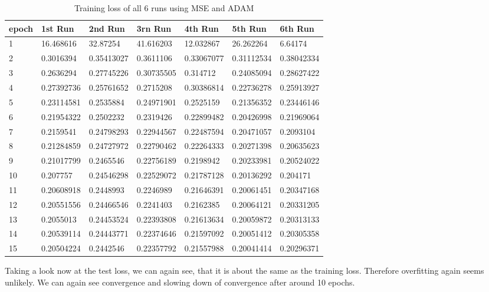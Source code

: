 \begin{table}[!ht]
    \centering
    \begin{tabular}{|l||l||l||l||l||l||l|}
    \hline
    epoch & 1st Run & 2nd Run & 3rn Run & 4th Run & 5th Run & 6th Run \\ \hline
        1 & 16.468616 & 32.87254 & 41.616203 & 12.032867 & 26.262264 & 6.64174 \\ \hline
        2 & 0.3016394 & 0.35413027 & 0.3611106 & 0.33067077 & 0.31112534 & 0.38042334 \\ \hline
        3 & 0.2636294 & 0.27745226 & 0.30735505 & 0.314712 & 0.24085094 & 0.28627422 \\ \hline
        4 & 0.27392736 & 0.25761652 & 0.2715208 & 0.30386814 & 0.22736278 & 0.25913927 \\ \hline
        5 & 0.23114581 & 0.2535884 & 0.24971901 & 0.2525159 & 0.21356352 & 0.23446146 \\ \hline
        6 & 0.21954322 & 0.2502232 & 0.2319426 & 0.22899482 & 0.20426998 & 0.21969064 \\ \hline
        7 & 0.2159541 & 0.24798293 & 0.22944567 & 0.22487594 & 0.20471057 & 0.2093104 \\ \hline
        8 & 0.21284859 & 0.24727972 & 0.22790462 & 0.22264333 & 0.20271398 & 0.20635623 \\ \hline
        9 & 0.21017799 & 0.2465546 & 0.22756189 & 0.2198942 & 0.20233981 & 0.20524022 \\ \hline
        10 & 0.207757 & 0.24546298 & 0.22529072 & 0.21787128 & 0.20136292 & 0.204171 \\ \hline
        11 & 0.20608918 & 0.2448993 & 0.2246989 & 0.21646391 & 0.20061451 & 0.20347168 \\ \hline
        12 & 0.20551556 & 0.24466546 & 0.2241403 & 0.2162385 & 0.20064121 & 0.20331205 \\ \hline
        13 & 0.2055013 & 0.24453524 & 0.22393808 & 0.21613634 & 0.20059872 & 0.20313133 \\ \hline
        14 & 0.20539114 & 0.24443771 & 0.22374646 & 0.21597092 & 0.20051412 & 0.20305358 \\ \hline
        15 & 0.20504224 & 0.2442546 & 0.22357792 & 0.21557988 & 0.20041414 & 0.20296371 \\ \hline
    \end{tabular}
    \caption{\label{tab:mse_adam_train}Training loss of all 6 runs using MSE and ADAM}
\end{table}

Taking a look now at the test loss, we can again see, that it is about the same as the training loss.
Therefore overfitting again seems unlikely. We can again see convergence and slowing down of convergence
after around 10 epochs.

